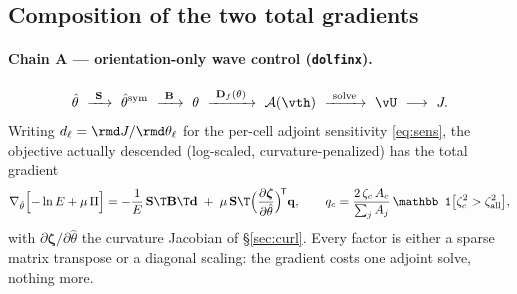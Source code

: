 \documentclass[11pt]{article}
\begin{document}
\subsection{Composition of the two total gradients}
\label{sec:algo:chain}
\paragraph{Chain A --- orientation-only wave control (\texttt{dolfinx}).}
\begin{equation}
  \hat\theta\ \xrightarrow{\ \mathbf S\ }\ \hat\theta^{\rm sym}
  \ \xrightarrow{\ \mathbf B\ }\ \theta
  \ \xrightarrow{\ \mathbf D_f(\theta)\ }\ \mathcal A(\vth)
  \ \xrightarrow{\ \text{solve}\ }\ \vU\ \longrightarrow\ J .
\end{equation}
Writing $d_\ell=\rmd J/\rmd\theta_\ell$ for the per-cell adjoint sensitivity
\eqref{eq:sens}, the objective actually descended (log-scaled, curvature-penalized)
has the total gradient
\begin{equation}
  \nabla_{\hat\theta}\Bigl[-\ln E+\mu\,\Pi\Bigr]
  =-\frac{1}{E}\,\mathbf S\T\mathbf B\T\mathbf d
  \;+\;\mu\,\mathbf S\T\Bigl(\frac{\partial\bm\zeta}{\partial\hat\theta}\Bigr)^{\!\mathsf T}
  \mathbf q,
  \qquad
  q_c=\frac{2\,\zeta_c\,A_c}{\sum_j A_j}\,
  \mathbb 1\bigl[\zeta_c^2>\zeta_{\rm all}^2\bigr],
  \label{eq:chainA}
\end{equation}
with $\partial\bm\zeta/\partial\hat\theta$ the curvature Jacobian of
\S\ref{sec:curl}. Every factor is either a sparse matrix transpose or a diagonal
scaling: the gradient costs one adjoint solve, nothing more.
\end{document}
